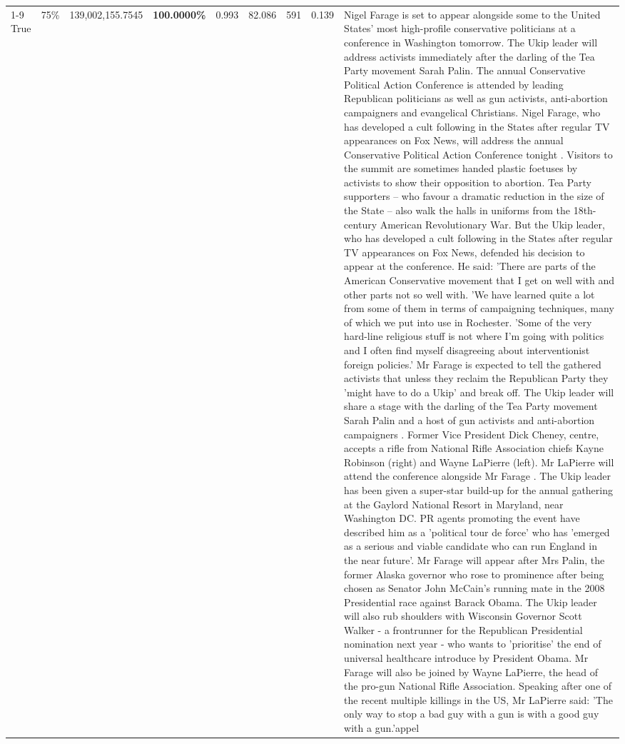 \begin{table}[H]
\begin{tabular}{lllrlllll}
\cline{1-9} \cline{2-9}
True & 75\% & 139,002,155.7545 & \bfseries \color{red} 100.0000\% & 0.993 & 82.086 & 591 & 0.139 & Nigel Farage is set to appear alongside some to the United States' most high-profile conservative politicians at a conference in Washington tomorrow. The Ukip leader will address activists immediately after the darling of the Tea Party movement Sarah Palin. The annual Conservative Political Action Conference is attended by leading Republican politicians as well as gun activists, anti-abortion campaigners and evangelical Christians. Nigel Farage, who has developed a cult following in the States after regular TV appearances on Fox News, will address the annual Conservative Political Action Conference tonight . Visitors to the summit are sometimes handed plastic foetuses by activists to show their opposition to abortion. Tea Party supporters – who favour a dramatic reduction in the size of the State – also walk the halls in uniforms from the 18th-century American Revolutionary War. But the Ukip leader, who has developed a cult following in the States after regular TV appearances on Fox News, defended his decision to appear at the conference. He said: 'There are parts of the American Conservative movement that I get on well with and other parts not so well with. 'We have learned quite a lot from some of them in terms of campaigning techniques, many of which we put into use in Rochester. 'Some of the very hard-line religious stuff is not where I'm going with politics and I often find myself disagreeing about interventionist foreign policies.' Mr Farage is expected to tell the gathered activists that unless they reclaim the Republican Party they 'might have to do a Ukip' and break off. The Ukip leader will share a stage with the darling of the Tea Party movement Sarah Palin and a host of gun activists and anti-abortion campaigners . Former Vice President Dick Cheney, centre, accepts a rifle from National Rifle Association chiefs Kayne Robinson (right) and Wayne LaPierre (left). Mr LaPierre will attend the conference alongside Mr Farage . The Ukip leader has been given a super-star build-up for the annual gathering at the Gaylord National Resort in Maryland, near Washington DC. PR agents promoting the event have described him as a 'political tour de force' who has 'emerged as a serious and viable candidate who can run England in the near future'. Mr Farage will appear after Mrs Palin, the former Alaska governor who rose to prominence after being chosen as Senator John McCain's running mate in the 2008 Presidential race against Barack Obama. The Ukip leader will also rub shoulders with Wisconsin Governor Scott Walker - a frontrunner for the Republican Presidential nomination next year - who wants to 'prioritise' the end of universal healthcare introduce by President Obama. Mr Farage will also be joined by Wayne LaPierre, the head of the pro-gun National Rifle Association. Speaking after one of the recent multiple killings in the US, Mr LaPierre said: 'The only way to stop a bad guy with a gun is with a good guy with a gun.'appel \\

\end{tabular}
\end{table}
